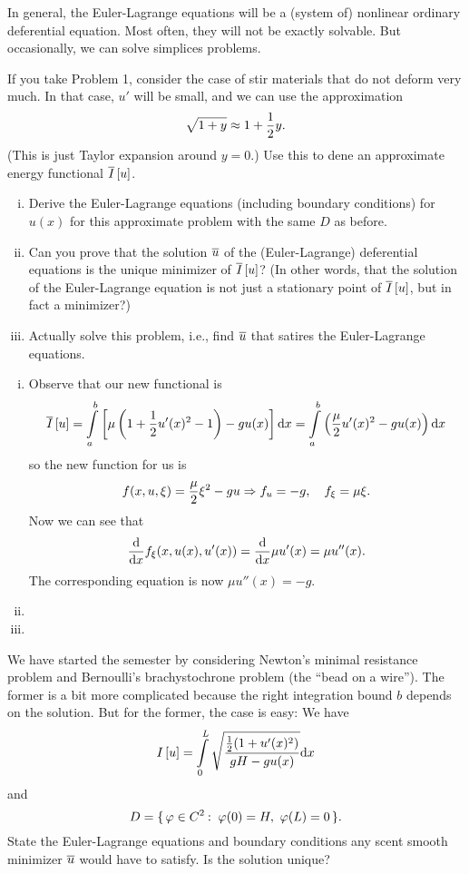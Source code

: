 \documentclass[12pt]{memoir}
\begin{document}
\begin{Ej}
    In general, the Euler-Lagrange equations will be a (system
    of) nonlinear ordinary deferential equation. Most often, they will not be exactly solvable. But occasionally,
    we can solve simplices problems.\par
    If you take Problem 1, consider the case of stir materials that do not deform very much. In that case, $u'$
    will be small, and we can use the approximation
    $$\sqrt{1+y}\approx 1+\half y.$$
    (This is just Taylor expansion around $y = 0$.) Use this to dene an approximate energy functional $\overline I\left\lbrack u\right\rbrack$.
    \begin{enumerate}[i)]
        \item Derive the Euler-Lagrange equations (including boundary conditions) for $u(x)$ for this approximate
        problem with the same $D$ as before.
        \item Can you prove that the solution $\overline u$ of the (Euler-Lagrange) deferential equations is the unique minimizer
        of $\overline I\left\lbrack u\right\rbrack$? (In other words, that the solution of the Euler-Lagrange equation is not just a stationary
        point of $\overline I\left\lbrack u\right\rbrack$, but in fact a minimizer?)
        \item Actually solve this problem, i.e., find $\overline u$ that satires the Euler-Lagrange equations.
    \end{enumerate}
\end{Ej}


\begin{ptcbr}
    \begin{enumerate}[i)]
        \item Observe that our new functional is 
        $$\ov I\bonj{u}=\int\limits_a^b \bonj{\mu\left(1+\half u'(x)^2-1\right)-gu(x)}\dd x=\int\limits_a^b \left(\frac{\mu}{2}u'(x)^2-gu(x)\right)\dd x$$
        so the new function for us is 
        $$f(x,u,\xi)=\frac{\mu}{2}\xi^2-gu\Rightarrow f_u=-g,\quad f_\xi=\mu\xi.$$
        Now we can see that
        $$\dv{x}f_{\xi}(x,u(x),u'(x))=\dv{x}\mu u'(x)=\mu u''(x).$$
        The corresponding equation is now $\mu u''(x)=-g$. 
        \item {}
        \item {}
    \end{enumerate}
\end{ptcbr}

\begin{Ej}
    We have started the semester by considering Newton's
    minimal resistance problem and Bernoulli's brachystochrone problem (the ``bead on a wire''). The former is
    a bit more complicated because the right integration bound $ b$ depends on the solution. But for the former,
    the case is easy: We have
    $$I\bonj{u}=\int\limits_0^L\sqrt{\frac{\half(1+u'(x)^2)}{gH-gu(x)}}\dd x$$
    and
    $$D=\set{\vf\in C^2\:\ \vf(0)=H,\ \vf(L)=0}.$$
    State the Euler-Lagrange equations and boundary conditions any scent smooth minimizer $\overline u$ would
have to satisfy. Is the solution unique?
\end{Ej}
\end{document}
